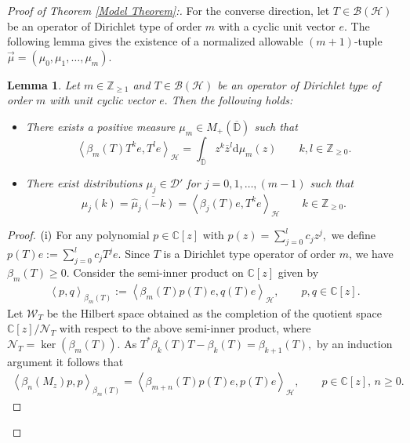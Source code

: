 \documentclass[10pt,oneside,reqno]{amsart}
\newtheorem{lemma}[theorem]{Lemma}
\theoremstyle{definition}
\theoremstyle{remark}
\newcommand{\calH}{{\mathcal{H}}}
\newcommand{\ip}[1]{\left\langle #1 \right\rangle}
\renewcommand{\ge}{\geqslant}
\newcommand{\Z}{\mathbb Z}
\newcommand{\D}{\mathbb D}
\numberwithin{equation}{section}
\begin{document}
\begin{proof}[Proof of Theorem \ref{Model Theorem}:]
    
For the converse direction, let $T\in\mathcal B(\calH)$ be an operator of Dirichlet type of order $m$ with a cyclic unit vector $e.$ The following lemma gives the existence of a normalized  allowable $(m+1)$-tuple $\overrightarrow{\mu} = \left( \mu_{0}, \mu_{1}, \ldots , \mu_{m} \right).$ 
\begin{lemma}\label{existence of distributions}
    Let $m\in \mathbb Z_{\geqslant 1}$ and $T\in \mathcal B(\calH)$ be an operator of Dirichlet type of order $m$ with unit cyclic vector $e.$ Then the following holds:
    \begin{itemize}
    \item[\rm (i)] There exists a positive measure  $\mu_{m}\in M_+(\overline{\D})$ such that 
 \begin{equation*}
	\ip{\beta_{m} (T) T^k e, T^l e}_{\calH} = \int_{\mathbb{\overline{\D}}} z^{k} \overline{z}^{l} \mathrm{d}\mu_{m} (z) \qquad k,l \in \Z _{\ge 0}.
    \end{equation*}
    \item[\rm (ii)] There exist distributions $\mu_j\in \mathcal D'$  for $j=0,1,\ldots,(m-1)$ such that
    \begin{equation*}
    \hat{\mu}_{j} \left( k \right) = \overline{\hat{\mu}_{j} \left( -k \right)} = \ip{\beta_{j} \left( T \right) e, T^{k}e}_{\calH} \qquad  k \in \mathbb Z_{\geqslant 0}.
\end{equation*}
\end{itemize}
\end{lemma}
\begin{proof}
   $(\rm i)$ For any polynomial $p\in\mathbb C[z]$ with $p(z)= \sum_{j=0}^lc_jz^j,$ we  define $p(T)e:=\sum_{j=0}^lc_jT^j e.$ Since $T$ is a Dirichlet type operator of order $m$, we have $\beta_{m}(T)\geqslant 0.$  Consider the semi-inner product on $\mathbb C[z]$ given by
   \begin{align*}
       \ip{p,q}_{\beta_m(T)}:= \ip{\beta_m(T) p(T)e, q(T)e}_{\calH},\qquad p,q\in \mathbb C[z].
   \end{align*}
   Let $\mathcal W_T$ be the Hilbert space obtained as the completion of the quotient space $\mathbb C[z]/{\mathcal N_T}$ with respect to the above semi-inner product, where $\mathcal N_T=\ker (\beta_m(T)).$ As $T^*\beta_{k}(T)T-\beta_k(T)=\beta_{k+1}(T),$ by an induction argument it follows that 
   \begin{align*}
       \ip{\beta_n(M_z) p,p}_{\beta_m(T)}= \ip{\beta_{m+n}(T)p(T)e, p(T)e}_{\calH},\qquad p\in\mathbb C[z],\,n\geqslant 0.
   \end{align*}

\end{proof}
\end{proof}
\end{document}
